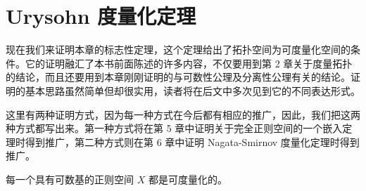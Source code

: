 \section{Urysohn 度量化定理}\label{section:ch04-urysohn-metrization}

现在我们来证明本章的标志性定理，这个定理给出了拓扑空间为可度量化空间的条件。它的证明融汇了本书前面陈述的许多内容，不仅要用到第 2 章关于度量拓扑的结论，而且还要用到本章刚刚证明的与可数性公理及分离性公理有关的结论。证明的基本思路虽然简单但却很实用，读者将在后文中多次见到它的不同表达形式。

这里有两种证明方式，因为每一种方式在今后都有相应的推广，因此，我们把这两种方式都写出来。第一种方式将在第 5 章中证明关于完全正则空间的一个嵌入定理时得到推广，第二种方式则在第 6 章中证明 Nagata-Smirnov 度量化定理时得到推广。

\begin{theorem}\label{theorem:ch04-urysohn-metrization}
每一个具有可数基的正则空间 $X$ 都是可度量化的。
\end{theorem}

